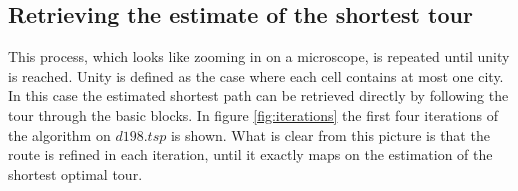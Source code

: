 \subsection{Retrieving the estimate of the shortest tour}
This process, which looks like zooming in on a microscope, is repeated until
 unity is reached. Unity is defined as the case where each cell contains at most one
city. In this case the estimated shortest path can be retrieved directly by following 
the tour through the basic blocks.
In figure \ref{fig:iterations} the first four iterations of the algorithm on
$d198.tsp$ is shown. What is clear from this picture is that the route is
refined in each iteration, until it exactly maps on the estimation  of the
shortest optimal tour.


